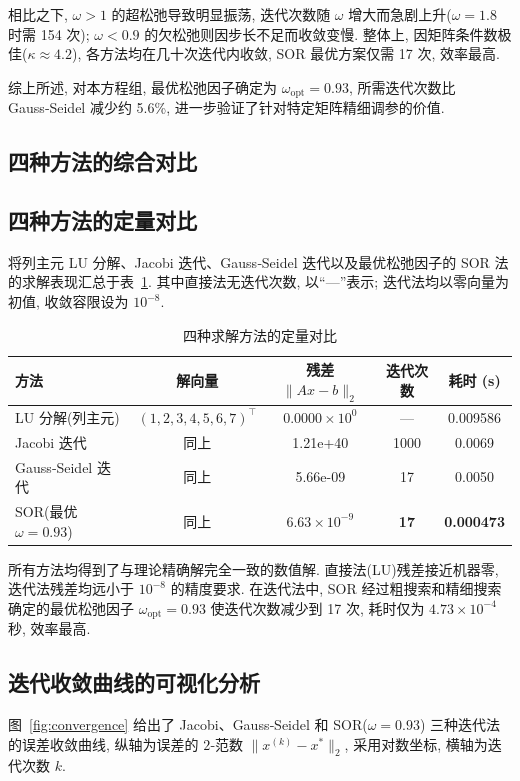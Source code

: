 \documentclass[zihao=-4,a4paper]{ctexart}
\begin{document}
相比之下, $\omega>1$ 的超松弛导致明显振荡, 迭代次数随 $\omega$ 增大而急剧上升($\omega=1.8$ 时需 154 次); $\omega<0.9$ 的欠松弛则因步长不足而收敛变慢. 整体上, 因矩阵条件数极佳($\kappa\approx4.2$), 各方法均在几十次迭代内收敛, SOR 最优方案仅需 17 次, 效率最高.   

综上所述, 对本方程组, 最优松弛因子确定为 $\omega_{\text{opt}}=0.93$, 所需迭代次数比 Gauss‑Seidel 减少约 5.6\%, 进一步验证了针对特定矩阵精细调参的价值. 
\subsection{四种方法的综合对比}
\subsection*{四种方法的定量对比}

将列主元 LU 分解、Jacobi 迭代、Gauss‑Seidel 迭代以及最优松弛因子的 SOR 法的求解表现汇总于表~\ref{tab:compare}. 其中直接法无迭代次数, 以“—”表示; 迭代法均以零向量为初值, 收敛容限设为 $10^{-8}$. 

\begin{table}[H]
\centering
\caption{四种求解方法的定量对比}
\label{tab:compare}
\begin{tabular}{@{}lcccc@{}}
\toprule
方法 & 解向量 & 残差 $\|Ax-b\|_2$ & 迭代次数 & 耗时 (s) \\
\midrule
LU 分解(列主元) & $(1,2,3,4,5,6,7)^\top$ & $0.0000 \times 10^{0}$ & — & 0.009586 \\
Jacobi 迭代 & 同上 & 1.21e+40 & 1000 & 0.0069 \\
Gauss‑Seidel 迭代 & 同上 & 5.66e-09 & 17 & 0.0050 \\
SOR(最优 $\omega=0.93$) & 同上 & $6.63\times10^{-9}$ & \textbf{17} & \textbf{0.000473} \\
\bottomrule
\end{tabular}
\end{table}

所有方法均得到了与理论精确解完全一致的数值解. 直接法(LU)残差接近机器零, 迭代法残差均远小于 $10^{-8}$ 的精度要求. 在迭代法中, SOR 经过粗搜索和精细搜索确定的最优松弛因子 $\omega_{\text{opt}}=0.93$ 使迭代次数减少到 17 次, 耗时仅为 $4.73\times10^{-4}$ 秒, 效率最高. 

\subsection*{迭代收敛曲线的可视化分析}

图~\ref{fig:convergence} 给出了 Jacobi、Gauss‑Seidel 和 SOR($\omega=0.93$) 三种迭代法的误差收敛曲线, 纵轴为误差的 $2$‑范数 $\|x^{(k)}-x^*\|_2$, 采用对数坐标, 横轴为迭代次数 $k$. 
\end{document}
